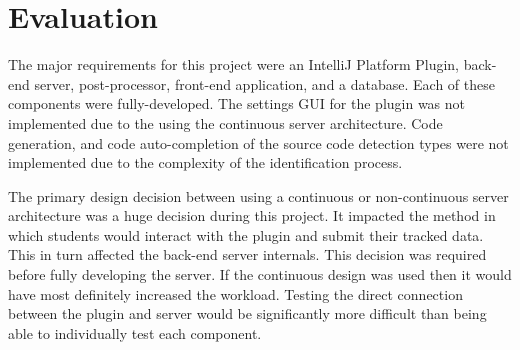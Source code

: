 \chapter{Evaluation}





The major requirements for this project were an IntelliJ Platform Plugin, back-end server, post-processor, front-end application, and a database. Each of these components were fully-developed. The settings GUI for the plugin was not implemented due to the using the continuous server architecture. Code generation, and code auto-completion of the source code detection types were not implemented due to the complexity of the identification process.

The primary design decision between using a continuous or non-continuous server architecture was a huge decision during this project. It impacted the method in which students would interact with the plugin and submit their tracked data. This in turn affected the back-end server internals. This decision was required before fully developing the server. If the continuous design was used then it would have most definitely increased the workload. Testing the direct connection between the plugin and server would be significantly more difficult than being able to individually test each component.

